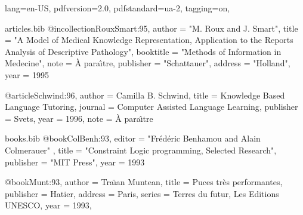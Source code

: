 \DocumentMetadata
  {
    lang=en-US,
    pdfversion=2.0,
    pdfstandard=ua-2,
    tagging=on,
  }
\begin{filecontents}[overwrite]{articles.bib}
@incollection{RouxSmart:95,
    author    = "M. Roux and J. Smart",
    title     = "A Model of Medical Knowledge Representation, Application
                 to the Reports Analysis of Descriptive Pathology",
    booktitle = "Methods of Information in Medecine",
    note      = {\`A para\^{\i}tre},
    publisher = "Schattauer",
    address   = "Holland",
    year      = 1995
}

@article{Schwind:96,
    author    = {Camilla B. Schwind},
    title     = {Knowledge Based Language Tutoring},
    journal   = {Computer Assisted Language Learning},
    publisher = {Svets},
    year      = 1996,
    note      = {\`A para\^{\i}tre}
}
\end{filecontents}
\begin{filecontents}[overwrite]{books.bib}
@book{ColBenh:93,
   editor = "Fr\'ed\'eric Benhamou and Alain Colmerauer" ,
   title = "Constraint Logic programming, Selected Research",
   publisher = "MIT Press",
   year = 1993
}

@book{Munt:93,
   author =    {Tra{\"\i}an Muntean},
   title =     {Puces tr\`es performantes},
   publisher = {Hatier},
   address =   {Paris},
   series = {Terres du futur, Les Editions UNESCO},
   year =      1993,
}
\end{filecontents}

\documentclass[10pt]{article}
\usepackage{bibtopic}
\usepackage{hyperref}

